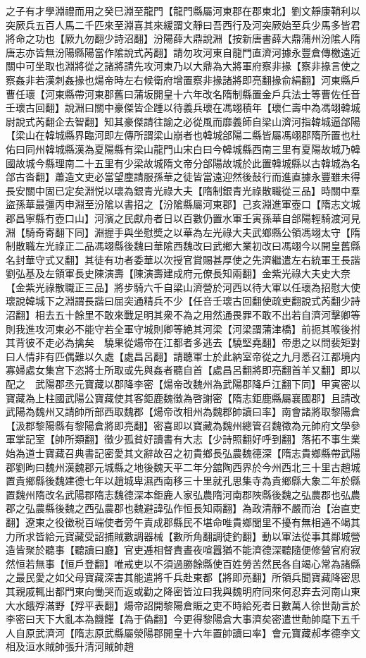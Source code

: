 之子有才學淵禮而用之癸巳淵至龍門【龍門縣屬河東郡在郡東北】劉文靜康鞘利以突厥兵五百人馬二千匹來至淵喜其來緩謂文靜曰吾西行及河突厥始至兵少馬多皆君將命之功也【厥九勿翻少詩沼翻】汾陽薛大鼎說淵【按新唐書薛大鼎蒲州汾隂人隋唐志亦皆無汾陽縣陽當作隂說式芮翻】請勿攻河東自龍門直濟河據永豐倉傳檄遠近關中可坐取也淵將從之諸將請先攻河東乃以大鼎為大將軍府察非掾【察非掾言使之察姦非若漢刺姦掾也煬帝時左右候衛府增置察非掾諸將即亮翻掾俞絹翻】河東縣戶曹任瓌【河東縣帶河東郡舊曰蒲坂開皇十六年改名隋制縣置金戶兵法士等曹佐任音壬瓌古回翻】說淵曰關中豪傑皆企踵以待義兵瓌在馮翊積年【瓌仁壽中為馮翊韓城尉說式芮翻企去智翻】知其豪傑請往諭之必從風而靡義師自梁山濟河指韓城逼郃陽【梁山在韓城縣界臨河即左傳所謂梁山崩者也韓城郃陽二縣皆屬馮翊郡隋所置也杜佑曰同州韓城縣漢為夏陽縣有梁山龍門山宋白曰今韓城縣西南三里有夏陽故城乃韓國故城今縣理南二十五里有少梁故城隋文帝分郃陽故城於此置韓城縣以古韓城為名郃古沓翻】蕭造文吏必當望塵請服孫華之徒皆當遠迎然後鼔行而進直據永豐雖未得長安關中固已定矣淵悦以瓌為銀青光祿大夫【隋制銀青光祿散職從三品】時關中羣盜孫華最彊丙申淵至汾隂以書招之【汾隂縣屬河東郡】己亥淵進軍壺口【隋志文城郡昌寧縣冇壺口山】河濱之民獻舟者日以百數仍置水軍壬寅孫華自郃陽輕騎渡河見淵【騎奇寄翻下同】淵握手與坐慰奬之以華為左光祿大夫武鄉縣公領馮翊太守【隋制散職左光祿正二品馮翊縣後魏曰華隂西魏改曰武鄉大業初改曰馮翊今以開皇舊縣名封華守式又翻】其徒有功者委華以次授官賞賜甚厚使之先濟繼遣左右統軍王長諧劉弘基及左領軍長史陳演壽【陳演壽建成府元僚長知兩翻】金紫光祿大夫史大奈【金紫光祿散職正三品】將步騎六千自梁山濟營於河西以待大軍以任瓌為招慰大使瓌說韓城下之淵謂長諧曰屈突通精兵不少【任咅壬瓌古回翻使疏吏翻說式芮翻少詩沼翻】相去五十餘里不敢來戰足明其衆不為之用然通畏罪不敢不出若自濟河擊卿等則我進攻河東必不能守若全軍守城則卿等絶其河梁【河梁謂蒲津橋】前扼其喉後拊其背彼不走必為擒矣　驍果從煬帝在江都者多逃去【驍堅堯翻】帝患之以問裴矩對曰人情非有匹偶難以久處【處昌呂翻】請聽軍士於此納室帝從之九月悉召江都境内寡婦處女集宫下恣將士所取或先與姦者聽自首【處昌呂翻將即亮翻首羊又翻】即以配之　武陽郡丞元寶藏以郡降李密【煬帝改魏州為武陽郡降戶江翻下同】甲寅密以寶藏為上柱國武陽公寶藏使其客鉅鹿魏徵為啓謝密【隋志鉅鹿縣屬襄國郡】且請改武陽為魏州又請帥所部西取魏郡【煬帝改相州為魏郡帥讀曰率】南會諸將取黎陽倉【汲郡黎陽縣有黎陽倉將即亮翻】密喜即以寶藏為魏州總管召魏徵為元帥府文學參軍掌記室【帥所類翻】徵少孤貧好讀書有大志【少詩照翻好呼到翻】落拓不事生業始為道士寶藏召典書記密愛其文辭故召之初貴鄉長弘農魏德深【隋志貴鄉縣帶武陽郡劉昫曰魏州漢魏郡元城縣之地後魏天平二年分舘陶西界於今州西北三十里古趙城置貴鄉縣後魏建德七年以趙城卑濕西南移三十里就孔思集寺為貴鄉縣大象二年於縣置魏州隋改名武陽郡隋志魏德深本鉅鹿人家弘農隋河南郡陜縣後魏之弘農郡也弘農郡之弘農縣後魏之西弘農郡也魏避諱弘作恒長知兩翻】為政清靜不嚴而治【治直吏翻】遼東之役徵税百端使者旁午責成郡縣民不堪命唯貴鄉閭里不擾有無相通不竭其力所求皆給元寶藏受詔捕賊數調器械【數所角翻調徒釣翻】動以軍法從事其鄰城營造皆聚於聽事【聽讀曰廳】官吏逓相督責晝夜喧囂猶不能濟德深聽隨便修營官府寂然恒若無事【恒戶登翻】唯戒吏以不須過勝餘縣使百姓勞苦然民各自竭心常為諸縣之最民愛之如父母寶藏深害其能遣將千兵赴東都【將即亮翻】所領兵聞寶藏降密思其親戚輒出都門東向慟哭而返或勸之降密皆泣曰我與魏明府同來何忍弃去河南山東大水餓殍滿野【殍平表翻】煬帝詔開黎陽倉賑之吏不時給死者日數萬人徐世勣言於李密曰天下大亂本為饑饉【為于偽翻】今更得黎陽倉大事濟矣密遣世勣帥麾下五千人自原武濟河【隋志原武縣屬滎陽郡開皇十六年置帥讀曰率】會元寶藏郝孝德李文相及洹水賊帥張升清河賊帥趙